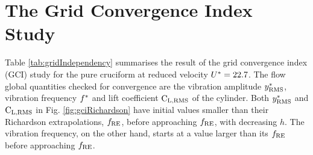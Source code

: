 \documentclass[oneside]{utmthesis}
\begin{document}
\section{The Grid Convergence Index Study} \label{sec:gciStudyResult}

\vspace{\baselineskip}

Table \ref{tab:gridIndependency} summarises the result of the grid convergence index (GCI) study for the pure cruciform at reduced velocity $U^{*} = 22.7$. The flow global quantities checked for convergence are the vibration amplitude $y^{*}_{\text{RMS}}$, vibration frequency $f^{*}$ and lift coefficient $\text{C}_{\text{L,RMS}}$ of the cylinder. Both $y^{*}_{\text{RMS}}$ and $\text{C}_{\text{L,RMS}}$ in Fig. \ref{fig:gciRichardson} have initial values smaller than their Richardson extrapolations, $f_{\text{RE}}$, before approaching $f_{\text{RE}}$, with decreasing $h$. The vibration frequency, on the other hand, starts at a value larger than its $f_{\text{RE}}$ before approaching $f_{\text{RE}}$.
\end{document}
